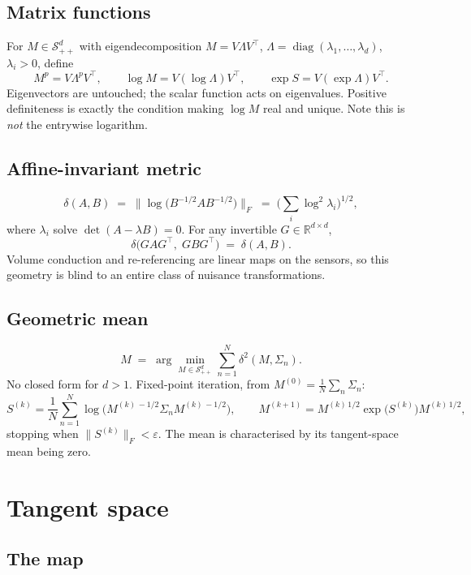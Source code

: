 \documentclass[11pt]{article}
\newcommand{\Real}{\mathbb{R}}
\newcommand{\SPD}[1]{\mathcal{S}^{#1}_{++}}
\begin{document}
\subsection{Matrix functions}

For $M \in \SPD{d}$ with eigendecomposition $M = V \Lambda V^\top$,
$\Lambda = \operatorname{diag}(\lambda_1,\dots,\lambda_d)$,
$\lambda_i > 0$, define
\[
M^{p} = V \Lambda^{p} V^\top, \qquad
\log M = V (\log \Lambda) V^\top, \qquad
\exp S = V (\exp \Lambda) V^\top .
\]
Eigenvectors are untouched; the scalar function acts on eigenvalues.
Positive definiteness is exactly the condition making $\log M$ real and
unique. Note this is \emph{not} the entrywise logarithm.

\subsection{Affine-invariant metric}

\[
\delta(A,B) \;=\; \big\| \log\!\big(B^{-1/2} A B^{-1/2}\big) \big\|_F
\;=\; \Big(\textstyle\sum_{i} \log^2 \lambda_i \Big)^{1/2},
\]
where $\lambda_i$ solve $\det(A - \lambda B)=0$. For any invertible
$G \in \Real^{d\times d}$,
\[
\delta\big(GAG^\top,\; GBG^\top\big) \;=\; \delta(A,B).
\]
Volume conduction and re-referencing are linear maps on the sensors, so
this geometry is blind to an entire class of nuisance transformations.

\subsection{Geometric mean}

\[
M \;=\; \arg\min_{M \in \SPD{d}} \sum_{n=1}^{N} \delta^2(M, \Sigma_n).
\]
No closed form for $d>1$. Fixed-point iteration, from
$M^{(0)} = \frac{1}{N}\sum_n \Sigma_n$:
\[
S^{(k)} = \frac{1}{N}\sum_{n=1}^{N}
   \log\!\big(M^{(k)\,-1/2} \Sigma_n M^{(k)\,-1/2}\big),
\qquad
M^{(k+1)} = M^{(k)\,1/2} \exp\!\big(S^{(k)}\big) M^{(k)\,1/2},
\]
stopping when $\|S^{(k)}\|_F < \varepsilon$. The mean is characterised
by its tangent-space mean being zero.

\section{Tangent space}

\subsection{The map}
\end{document}
